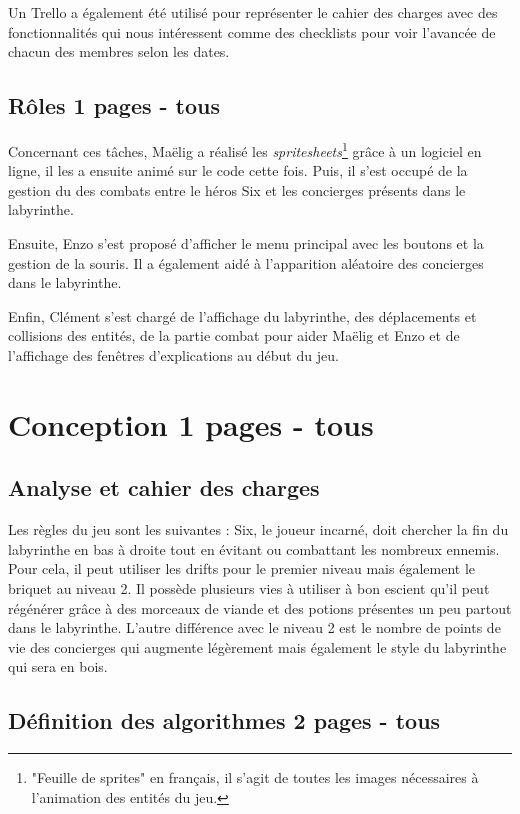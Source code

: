 \documentclass[10pt]{article}
\begin{document}
   Un Trello a également été utilisé pour représenter le cahier des charges avec des 
   fonctionnalités qui nous intéressent comme des checklists pour voir l'avancée de chacun des membres selon les dates.
   \subsection{Rôles 1 pages - tous}
   Concernant ces tâches, Maëlig a réalisé les \textit{spritesheets}\footnote{"Feuille de sprites" en français, il s'agit de toutes les images nécessaires
   à l'animation des entités du jeu.} grâce à un logiciel en ligne, il les a ensuite animé sur le code cette fois. Puis, il s'est occupé de la gestion du 
   des combats entre le héros Six et les concierges présents dans le labyrinthe.

   Ensuite, Enzo s'est proposé d'afficher le menu principal avec les boutons et la gestion de la souris. Il a également aidé à l'apparition aléatoire des 
   concierges dans le labyrinthe. 
   
   Enfin, Clément s'est chargé de l'affichage du labyrinthe, des déplacements et collisions des entités, de la partie combat pour aider Maëlig et Enzo
   et de l'affichage des fenêtres d'explications au début du jeu.
   \clearpage
\section{Conception 1 pages - tous}
   \subsection{Analyse et cahier des charges}
   Les règles du jeu sont les suivantes : Six, le joueur incarné, doit chercher la fin du labyrinthe en bas à droite tout en évitant ou combattant les 
   nombreux ennemis. Pour cela, il peut utiliser les drifts pour le premier niveau mais également le briquet au niveau 2. Il possède plusieurs vies à 
   utiliser à bon escient qu'il peut régénérer grâce à des morceaux de viande et des potions présentes un peu partout dans le labyrinthe. L'autre
   différence avec le niveau 2 est le nombre de points de vie des concierges qui augmente légèrement mais également le style du labyrinthe qui sera en bois.

   \subsection{Définition des algorithmes 2 pages - tous}
\end{document}
